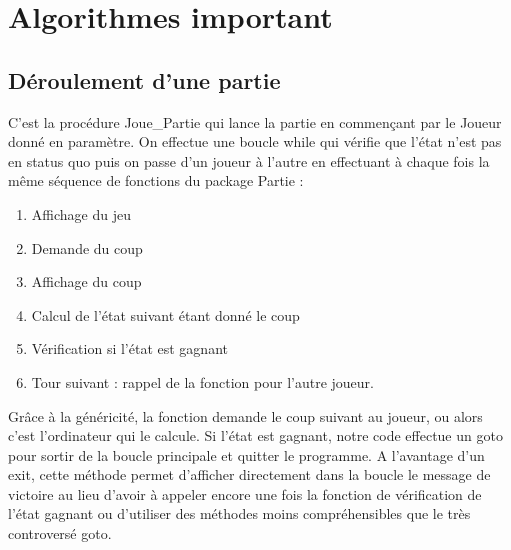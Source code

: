 \documentclass[a4paper, 10pt, french]{article}
\begin{document}
\section{Algorithmes important}
{

    \subsection{Déroulement d'une partie}
    {
        C'est la procédure Joue\_Partie qui lance la partie en commençant par le Joueur donné en paramètre. On effectue une boucle
        while qui vérifie que l'état n'est pas en status quo puis on passe d'un joueur à l'autre en effectuant à chaque fois
        la même séquence de fonctions du package Partie :
        \begin{enumerate}
            \item Affichage du jeu
            \item Demande du coup
            \item Affichage du coup
            \item Calcul de l'état suivant étant donné le coup
            \item Vérification si l'état est gagnant
            \item Tour suivant : rappel de la fonction pour l'autre joueur.
        \end{enumerate}
        Grâce à la généricité, la fonction demande le coup suivant au joueur, ou alors c'est l'ordinateur qui le calcule.
        Si l'état est gagnant, notre code effectue un goto pour sortir de la boucle principale et quitter le programme.
        A l'avantage d'un exit, cette méthode permet d'afficher directement dans la boucle le message de victoire au lieu
        d'avoir à appeler encore une fois la fonction de vérification de l'état gagnant ou d'utiliser des méthodes moins
        compréhensibles que le très controversé goto.
    }

}
\end{document}

